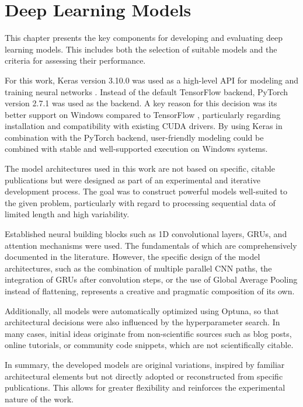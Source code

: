 \section{Deep Learning Models}
\label{chap:dl-models}

This chapter presents the key components for developing and evaluating deep learning models.
This includes both the selection of suitable models and the criteria for assessing their performance.

For this work, Keras version 3.10.0 was used as a high-level API for modeling and training neural networks \cite{keras-home}.
Instead of the default TensorFlow backend, PyTorch version 2.7.1 was used as the backend.
A key reason for this decision was its better support on Windows compared to TensorFlow \cite{tf-windows}, particularly regarding installation and compatibility with existing CUDA drivers.
By using Keras in combination with the PyTorch backend, user-friendly modeling could be combined with stable and well-supported execution on Windows systems.

The model architectures used in this work are not based on specific, citable publications but were designed as part of an experimental and iterative development process.
The goal was to construct powerful models well-suited to the given problem, particularly with regard to processing sequential data of limited length and high variability.

Established neural building blocks such as 1D convolutional layers, GRUs, and attention mechanisms were used.
The fundamentals of which are comprehensively documented in the literature.
However, the specific design of the model architectures, such as the combination of multiple parallel CNN paths, the integration of GRUs after convolution steps, or the use of Global Average Pooling instead of flattening, represents a creative and pragmatic composition of its own.

Additionally, all models were automatically optimized using Optuna, so that architectural decisions were also influenced by the hyperparameter search.
In many cases, initial ideas originate from non-scientific sources such as blog posts, online tutorials, or community code snippets, which are not scientifically citable.

In summary, the developed models are original variations, inspired by familiar architectural elements but not directly adopted or reconstructed from specific publications.
This allows for greater flexibility and reinforces the experimental nature of the work.

